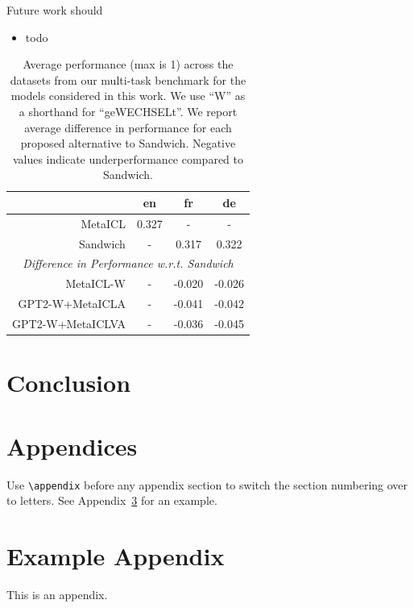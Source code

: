 \documentclass[11pt]{article}
\begin{document}
Future work should
\begin{itemize}
	\item todo
\end{itemize}



\begin{table}[ht]
	\centering
	\caption{Average performance (max is 1) across the datasets from our multi-task benchmark for the
		models considered in this work. We use ``W'' as a shorthand for ``geWECHSELt''. We report average
		difference in performance for each proposed alternative to Sandwich. Negative values indicate
		underperformance compared to Sandwich.}
	\label{tab:results-summary}
	\begin{tabular}{@{}rccc@{}}
		\toprule
		\multicolumn{1}{c}{} & en    & fr     & de                             \\ \midrule
		MetaICL              & 0.327 & -      & -                              \\
		Sandwich             & -     & 0.317  & 0.322                          \\ \midrule
		\multicolumn{4}{c}{\textit{Difference in Performance w.r.t. Sandwich}} \\
		MetaICL-W            & -     & -0.020 & -0.026                         \\
		GPT2-W+MetaICLA      & -     & -0.041 & -0.042                         \\
		GPT2-W+MetaICLVA     & -     & -0.036 & -0.045                         \\ \bottomrule
	\end{tabular}
\end{table}

\section{Conclusion}



\section{Appendices}

Use \verb|\appendix| before any appendix section to switch the section numbering over to letters. See Appendix~\ref{sec:appendix} for an example.

\appendix
\section{Example Appendix}
\label{sec:appendix}

This is an appendix.
\end{document}
